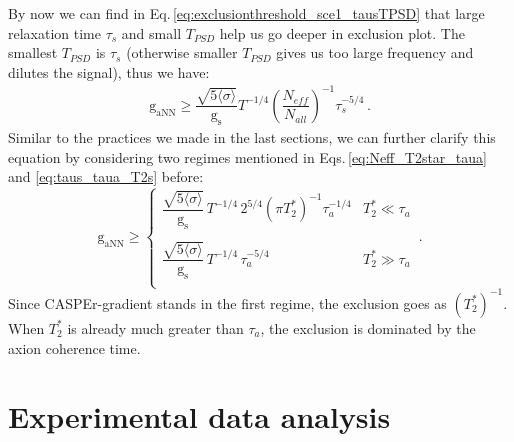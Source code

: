 By now we can find in Eq.\,\eqref{eq:exclusionthreshold_sce1_tausTPSD} that large relaxation time $\tau_s$ and small $T_{PSD}$ help us go deeper in exclusion plot. The smallest $T_{PSD}$ is $\tau_s$ (otherwise smaller $T_{PSD}$ gives us too large frequency and dilutes the signal), thus we have: 
\begin{align}
        \mathrm{g_{aNN}} \geqslant \dfrac{\sqrt{5 \langle\sigma\rangle}}{\mathrm{g_{s}}}    T^{-1/4} \left(\dfrac{N_{eff}}{N_{all}}\right)^{-1} \tau_s^{-5/4}   \,. \label{eq:exclusionthreshold_sce1_tausonly}
\end{align}
Similar to the practices we made in the last sections, we can further clarify this equation by considering two regimes mentioned in Eqs.\,\eqref{eq:Neff_T2star_taua} and \eqref{eq:taus_taua_T2s} before:
\begin{equation}
    \mathrm{g_{aNN}} \geqslant \left\{
    \begin{array}{cl}
    \dfrac{\sqrt{5 \langle\sigma\rangle}}{\mathrm{g_{s}}}\,   T^{-1/4} \, 2^{5/4} (\pi T_2^*)^{-1} \tau_a^{-1/4}   &  T_2^* \ll \tau_a\\
     & \\
    \dfrac{\sqrt{5 \langle\sigma\rangle}}{\mathrm{g_{s}}}\,  T^{-1/4}   \,   \tau_a^{-5/4}     &  T_2^*  \gg \tau_a\\
    \end{array} \right.\,.\label{eq:gaNN_taua_T2star_2regimes_single}
\end{equation}
 Since CASPEr-gradient stands in the first regime, the exclusion goes as $(T_2^*)^{-1}$. When $T_2^*$ is already much greater than $\tau_a$, the exclusion is dominated by the axion coherence time.



\section{Experimental data analysis}


